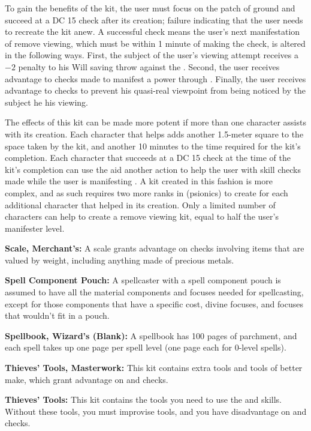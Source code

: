 To gain the benefits of the kit, the user must focus on the patch of ground and succeed at a DC 15  check after its creation; failure indicating that the user needs to recreate the kit anew. A successful check means the user's next manifestation of remove viewing, which must be within 1 minute of making the check, is altered in the following ways. First, the subject of the user's viewing attempt receives a $-2$ penalty to his Will saving throw against the . Second, the user receives advantage to  checks made to manifest a power through . Finally, the user receives advantage to  checks to prevent his quasi-real viewpoint from being noticed by the subject he his viewing.

The effects of this kit can be made more potent if more than one character assists with its creation. Each character that helps adds another 1.5-meter square to the space taken by the kit, and another 10 minutes to the time required for the kit's completion. Each character that succeeds at a DC 15  check at the time of the kit's completion can use the aid another action to help the user with skill checks made while the user is manifesting . A kit created in this fashion is more complex, and as such requires two more ranks in  (psionics) to create for each additional character that helped in its creation. Only a limited number of characters can help to create a remove viewing kit, equal to half the user's manifester level.

\textbf{Scale, Merchant's:} A scale grants advantage on  checks involving items that are valued by weight, including anything made of precious metals.

\textbf{Spell Component Pouch:} A spellcaster with a spell component pouch is assumed to have all the material components and focuses needed for spellcasting, except for those components that have a specific cost, divine focuses, and focuses that wouldn't fit in a pouch.

\textbf{Spellbook, Wizard's (Blank):} A spellbook has 100 pages of parchment, and each spell takes up one page per spell level (one page each for 0-level spells).

\textbf{Thieves' Tools, Masterwork:} This kit contains extra tools and tools of better make, which grant advantage on  and  checks.

\textbf{Thieves' Tools:} This kit contains the tools you need to use the  and  skills. Without these tools, you must improvise tools, and you have disadvantage on  and  checks.

